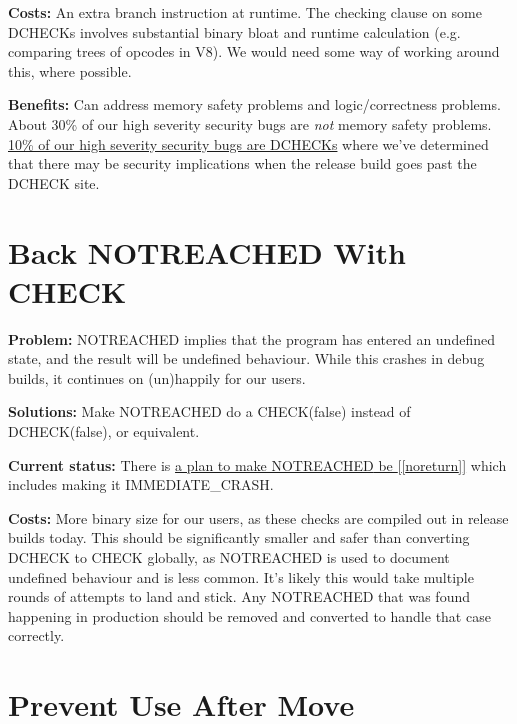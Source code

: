\documentclass[a4paper,12pt,notitlepage,twoside,openright]{article}
\newcommand{\uline}[1]{#1}
\begin{document}
{\textbf{Costs:} An extra branch instruction at runtime. The checking
clause on some DCHECKs involves substantial binary bloat and runtime
calculation (e.g. comparing trees of opcodes in V8). We would need some
way of working around this, where possible.

\textbf{Benefits:} Can address memory safety problems and
logic/correctness problems. About 30\% of our high severity security
bugs are \emph{not} memory safety
problems. \href{https://docs.google.com/document/d/e/2PACX-1vRZr-HJcYmf2Y76DhewaiJOhRNpjGHCxliAQTBhFxzv1QTae9o8mhBmDl32CRIuaWZLt5kVeH9e9jXv/pub\#h.eoikp3r0cwlf}{\uline{10\%
of our high severity security bugs are DCHECKs}} where we've determined
that there may be security implications when the release build goes past
the DCHECK site.

\section{Back NOTREACHED With CHECK}

\textbf{Problem:} NOTREACHED implies that the program has entered an
undefined state, and the result will be undefined behaviour. While this
crashes in debug builds, it continues on (un)happily for our users.

\textbf{Solutions:} Make NOTREACHED do a CHECK(false) instead
of DCHECK(false), or equivalent.

\textbf{Current status:} There
is \uline{\href{https://www.google.com/url?q=https://bugs.chromium.org/p/chromium/issues/detail?id\%3D851128\&sa=D\&source=editors\&ust=1631944129105000\&usg=AOvVaw2LrM6i2LECKEjRcO5h20mN}{a
plan to
make NOTREACHED}\href{https://www.google.com/url?q=https://bugs.chromium.org/p/chromium/issues/detail?id\%3D851128\&sa=D\&source=editors\&ust=1631944129106000\&usg=AOvVaw34qgxqGkGdOZeZV-chozbg}{ be {[}{[}noreturn{]}{]}}} which
includes making it IMMEDIATE\_CRASH.

\textbf{Costs:} More binary size for our users, as these checks are
compiled out in release builds today. This should be significantly
smaller and safer than converting DCHECK to CHECK globally,
as NOTREACHED is used to document undefined behaviour and is less
common. It's likely this would take multiple rounds of attempts to land
and stick. Any NOTREACHED that was found happening in production should
be removed and converted to handle that case correctly.

\section{Prevent Use After Move}

}
\end{document}
